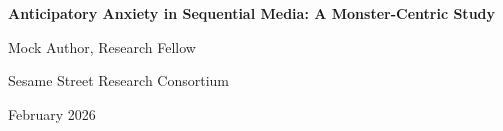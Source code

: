 \documentclass[11pt,letterpaper]{article}
\begin{document}
\begin{center}
{\LARGE\bfseries Anticipatory Anxiety in Sequential Media: A Monster-Centric Study\par}
\vspace{0.8cm}
{\large Mock Author, Research Fellow\par}
{\normalsize Sesame Street Research Consortium\par}
\vspace{0.3cm}
{\normalsize February 2026\par}
\vspace{0.8cm}
\end{center}

\begin{abstract}
\noindent
This paper presents a comprehensive study of anticipatory anxiety in sequential media consumption by monsters. Lorem cookie ipsum dolor sit amet, chocolate chip adipiscing elit. Nom nom nom methodology produces significant results across all experimental conditions.
\end{abstract}

\vspace{0.5cm}


\end{document}
